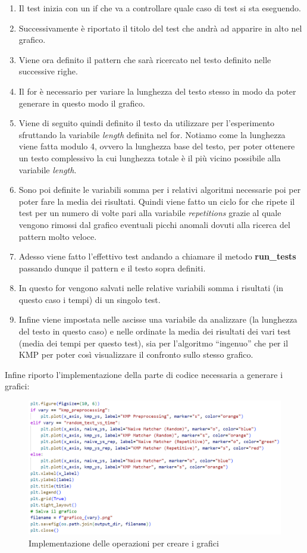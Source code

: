 \documentclass{article}
\begin{document}
\begin{enumerate}
    \item Il test inizia con un if che va a controllare quale caso di test si sta eseguendo.
    \item Successivamente è riportato il titolo del test che andrà ad apparire in alto nel grafico.
    \item Viene ora definito il pattern che sarà ricercato nel testo definito nelle successive righe.
    \item Il for è necessario per variare la lunghezza del testo stesso in modo da poter generare in questo modo il grafico.
    \item Viene di seguito quindi definito il testo da utilizzare per l'esperimento sfruttando la variabile \textit{length} definita nel for. Notiamo come la lunghezza viene fatta modulo 4, ovvero la lunghezza base del testo, per poter ottenere un testo complessivo la cui lunghezza totale è il più vicino possibile alla variabile \textit{length}.
    \item Sono poi definite le variabili somma per i relativi algoritmi necessarie poi per poter fare la media dei risultati. Quindi viene fatto un ciclo for che ripete il test per un numero di volte pari alla variabile \textit{repetitions} grazie al quale vengono rimossi dal grafico eventuali picchi anomali dovuti alla ricerca del pattern molto veloce.
    \item Adesso viene fatto l'effettivo test andando a chiamare il metodo \textbf{run\_tests} passando dunque il pattern e il testo sopra definiti.
    \item In questo for vengono salvati nelle relative variabili somma i risultati (in questo caso i tempi) di un singolo test.
    \item Infine viene impostata nelle ascisse una variabile da analizzare (la lunghezza del testo in questo caso) e nelle ordinate la media dei risultati dei vari test (media dei tempi per questo test), sia per l'algoritmo ``ingenuo'' che per il KMP per poter così visualizzare il confronto sullo stesso grafico.
\end{enumerate}
Infine riporto l'implementazione della parte di codice necessaria a generare i grafici:
\begin{figure}[H]
    \centering
    \includegraphics[width=1\textwidth]{img/Plot_graphs.png}
    \caption{Implementazione delle operazioni per creare i grafici}
    \label{fig:plot-graphs}
\end{figure}
\end{document}
